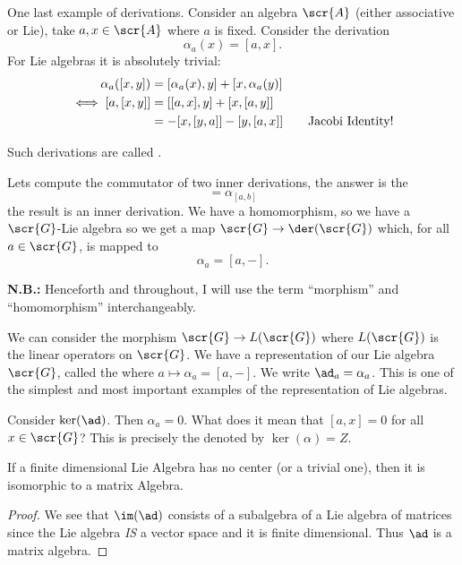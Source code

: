 One last example of derivations. Consider an algebra $\scr{A}$
(either associative or Lie), take $a,x\in\scr{A}$ where $a$ is
fixed. Consider the derivation
\begin{equation}
\alpha_{a}(x)=[a,x].
\end{equation}
For Lie algebras it is absolutely trivial:
\begin{subequations}
\begin{align}
\alpha_{a}([x,y]) &= [\alpha_{a}(x),y]+[x,\alpha_{a}(y)]\\
\iff[a,[x,y]] &=[[a,x],y]+[x,[a,y]]\\
&=-[x,[y,a]]-[y,[a,x]]\qquad\hbox{Jacobi Identity!}
\end{align}
\end{subequations}
\begin{rmk}
Such derivations are called .
\end{rmk}
Lets compute the commutator of two inner derivations, the answer
is the
\begin{equation}
[\alpha_a,\alpha_b]=\alpha_{[a,b]}
\end{equation}
the result is an  inner derivation. We have a homomorphism, so we
have a $\scr{G}$-Lie algebra so we get a map
$\scr{G}\to\der({\scr{G}})$ which, for all $a\in\scr{G}$, is mapped
to
\begin{equation}
\alpha_a=[a,-].
\end{equation}

\medbreak
\noindent\textbf{N.B.:} Henceforth and throughout, I will use the
term ``morphism'' and ``homomorphism'' interchangeably. 

We can consider the morphism $\scr{G}\to L(\scr{G})$ where
$L(\scr{G})$ is the linear operators on $\scr{G}$. We have a
representation of our Lie algebra $\scr{G}$, called the
 where
$a\mapsto\alpha_a=[a,-]$. We write $\ad_{a}=\alpha_a$. This is
one of the simplest and most important examples of the
representation of Lie algebras.

Consider $\ker(\ad)$. Then $\alpha_a=0$. What does it mean that
$[a,x]=0$ for all $x\in\scr{G}$? This is precisely the
 denoted by $\ker(\alpha)=Z$.
\begin{thm}
If a finite dimensional Lie Algebra has no center (or a trivial one), then it is
isomorphic to a matrix Algebra.
\end{thm}
\begin{proof}
We see that $\im(\ad)$ consists of a subalgebra of a Lie algebra
of matrices since the Lie algebra \emph{IS} a vector space and it
is finite dimensional. Thus $\ad$ is a matrix algebra.
\end{proof}
